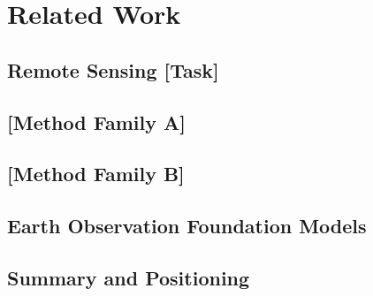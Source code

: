 \documentclass[journal,onecolumn,draftcls]{IEEEtran}
\begin{document}
\section{Related Work}
\label{sec:related}


\subsection{Remote Sensing [Task]}
\label{sec:related-task}


\subsection{[Method Family A]}
\label{sec:related-familyA}


\subsection{[Method Family B]}
\label{sec:related-familyB}


\subsection{Earth Observation Foundation Models}
\label{sec:related-foundation}


\subsection{Summary and Positioning}
\label{sec:related-summary}

\end{document}
